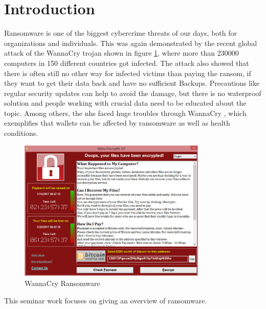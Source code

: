 \section{Introduction}

Ransomware is one of the biggest cybercrime threats of our days, both for organizations and individuals. This was again demonstrated by the recent global attack of the WannaCry trojan \cite{Symantec2017} shown in figure \ref{fig:wanna_cry}, where more than 230000 computers in 150 different countries got infected. The attack also showed that there is often still no other way for infected victims than paying the ransom, if they want to get their data back and have no sufficient Backups. Precautions like regular security updates can help to avoid the damage, but there is no waterproof solution and people working with crucial data need to be educated about the topic. Among others, the \gls{nhs} faced huge troubles through WannaCry \cite{Martin2017}, which exemplifies that wallets can be affected by ransomware as well as health conditions.

\begin{figure}[htbp]
  \begin{center}
    \includegraphics[width=0.8\textwidth]{images/wanna_cry.png}
    \caption{WannaCry Ransomware}
    \label{fig:wanna_cry}
  \end{center}
\end{figure}

This seminar work focuses on giving an overview of ransomware.
